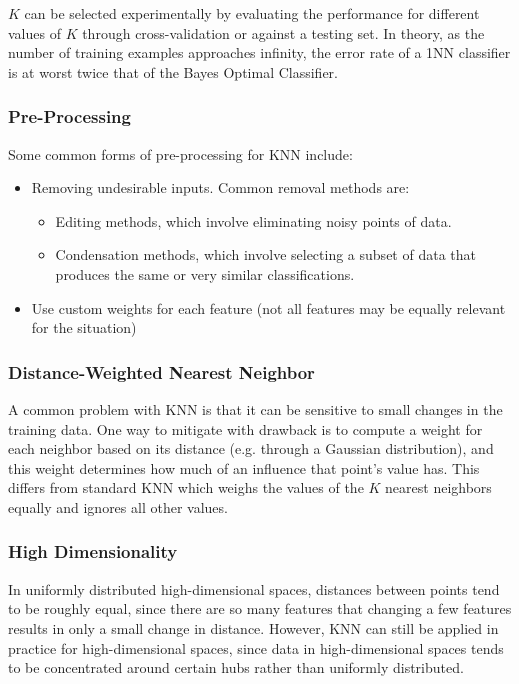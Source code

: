\documentclass[12pt]{article}
\begin{document}
            $K$ can be selected experimentally by evaluating the performance for different values of $K$ through cross-validation or against a testing set. In theory, as
            the number of training examples approaches infinity, the error rate of a 1NN classifier is at worst twice that of the Bayes Optimal Classifier.

        \subsubsection{Pre-Processing}
            Some common forms of pre-processing for KNN include:
            \begin{itemize}
              \item Removing undesirable inputs. Common removal methods are:
                \begin{itemize}
                  \item Editing methods, which involve eliminating noisy points of data.
                  \item Condensation methods, which involve selecting a subset of data that produces the same or very similar classifications.
                \end{itemize}
              \item Use custom weights for each feature (not all features may be equally relevant for the situation)
            \end{itemize}

        \subsubsection{Distance-Weighted Nearest Neighbor}
            A common problem with KNN is that it can be sensitive to small changes in the training data. One way to mitigate with drawback is to compute a weight for
            each neighbor based on its distance (e.g. through a Gaussian distribution), and this weight determines how much of an influence that point's value has.
            This differs from standard KNN which weighs the values of the $K$ nearest neighbors equally and ignores all other values.

        \subsubsection{High Dimensionality}
            In uniformly distributed high-dimensional spaces, distances between points tend to be roughly equal, since there are so many features that changing a few
            features results in only a small change in distance. However, KNN can still be applied in practice for high-dimensional spaces, since data in high-dimensional
            spaces tends to be concentrated around certain hubs rather than uniformly distributed.
\end{document}
